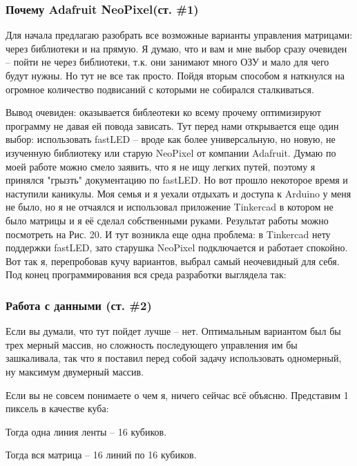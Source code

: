 \documentclass[a4paper, 12pt]{article}
\begin{document}
\subsubsection{Почему  Adafruit NeoPixel(ст. \#1)}

Для начала предлагаю разобрать все возможные варианты управления матрицами:
через библиотеки и на прямую. Я думаю, что и вам и мне выбор сразу очевиден --
пойти не через библиотеки, т.к. они занимают много ОЗУ и мало для чего будут
нужны. Но тут не все так просто. Пойдя вторым способом я наткнулся на огромное
количество подвисаний с которыми не собирался сталкиваться.

Вывод очевиден: оказывается библеотеки ко всему прочему оптимизируют программу
не давая ей повода зависать. Тут перед нами открывается еще один выбор:
использовать fastLED -- вроде как более универсальную, но новую, не изученную
библиотеку или старую NeoPixel от компании Adafruit. Думаю по моей работе можно
смело заявить, что я не ищу легких путей, поэтому я принялся "грызть"
документацию по fastLED. Но вот прошло некоторое время и наступили каникулы.
Моя семья и я уехали отдыхать и доступа к Arduino у меня не было, но я не
отчаялся и использовал приложение Tinkercad в котором не было матрицы и я её
сделал собственными руками. Результат работы можно посмотреть на Рис. 20.
И тут возникла еще одна проблема: в Tinkercad нету поддержки fastLED, зато
старушка NeoPixel подключается и работает спокойно. Вот так я, перепробовав
кучу вариантов, выбрал самый неочевидный для себя. Под конец программирования
вся среда разработки выглядела так:

\newpage
\subsubsection{Работа с данными (ст. \#2)}

Если вы думали, что тут пойдет лучше -- нет. Оптимальным вариантом был бы
трех мерный массив, но сложность последующего управления им бы зашкаливала,
так что я поставил перед собой задачу использовать одномерный, ну максимум
двумерный массив.

Если вы не совсем понимаете о чем я, ничего сейчас всё объясню. Представим 1
пиксель в качестве куба:


Тогда одна линия ленты -- 16 кубиков.


Тогда вся матрица -- 16 линий по 16 кубиков.
\end{document}
